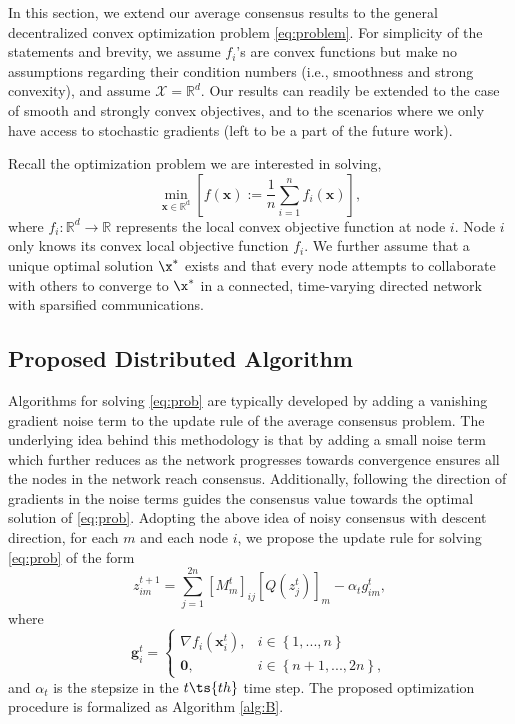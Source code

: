 In this section, we extend our average consensus results to the general decentralized convex optimization problem \eqref{eq:problem}. For simplicity of the statements and brevity, we assume $f_i$'s are convex functions but make no assumptions regarding their condition numbers (i.e., smoothness and strong convexity), and assume $\mathcal{X} = \mathbb{R}^d$. Our results can readily be extended to the case of smooth and strongly convex objectives, and to the scenarios where we only have access to stochastic gradients (left to be a part of the future work).

Recall the optimization problem we are interested in solving,
\begin{equation}\label{eq:prob}
\min_{\mathrm{\mathbf{x} \in \mathbb{R}^d}} \left[f(\mathbf{x}):=\frac{1}{n}\sum_{i=1}^n f_i(\mathbf{x})\right],
\end{equation}
where $f_i: \mathbb{R}^d \to \mathbb{R}$ represents the local convex objective function at node $i$. Node $i$ only knows its convex local objective function $f_i$. We further assume that a unique optimal solution $\x^*$ exists and that every node attempts to collaborate with others to converge to $\x^*$ in a connected, time-varying directed network with sparsified communications. 

\subsection{Proposed Distributed Algorithm}
Algorithms for solving \eqref{eq:prob} are typically developed by adding a vanishing gradient noise term to the update rule of the average consensus problem. The underlying idea behind this methodology is that by adding a small noise term which further reduces as the network progresses towards convergence ensures all the nodes in the network reach consensus. Additionally, following the direction of gradients in the noise terms guides the consensus value towards the optimal solution of \eqref{eq:prob}.
Adopting the above idea of noisy consensus with descent direction, for each $m$ and each node $i$, we propose the update rule for solving \eqref{eq:prob} of the form
\begin{equation}
z_{im}^{t+1}=\sum_{j=1}^{2n}[M^t_m]_{ij} [Q(z_{j}^t)]_m-\alpha_t g_{im}^t,
\end{equation}
where 
\begin{equation}
    \mathbf{g}_i^t =\begin{cases}
\nabla f_i(\mathbf{x}_i^t), & i \in \left\{1, ..., n \right\}\\
\mathbf{0}, & i \in \left\{n+1, ..., 2n \right\},
\end{cases}
\end{equation}
and $\alpha_t$ is the stepsize in the $t\ts{th}$ time step. The proposed optimization procedure is formalized as Algorithm \ref{alg:B}.
